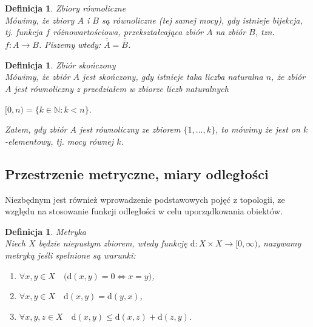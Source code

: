 \documentclass[12pt,a4paper]{report}
\newtheorem{definition}[theorem]{Definicja}
\newcommand{\licznosc}[1]{\overline{\overline{#1}}}
\begin{document}
\begin{definition}{Zbiory równoliczne \cite[Rozdział 5]{blaszczyk2007}\\}
Mówimy, że zbiory $A$ i $B$ są równoliczne (tej samej mocy), gdy istnieje bijekcja, tj. funkcja $f$ różnowartościowa, przekształcająca zbiór $A$ na zbiór $B$, tzn. $f: A \rightarrow B$. Piszemy wtedy:  $\licznosc{A}=\licznosc{B}$.
\end{definition}

\begin{definition}{Zbiór skończony \cite[Rozdział 5]{blaszczyk2007}\\}
Mówimy, że zbiór $A$ jest skończony, gdy istnieje taka liczba naturalna $n$, że zbiór $A$ jest równoliczny z przedziałem w zbiorze liczb naturalnych
\begin{center}
$[0, n) = \{ k \in \mathbb{N}: k < n\}.$
\end{center}
Zatem, gdy zbiór $A$ jest równoliczny ze zbiorem $\{1, ..., k\}$, to mówimy że jest on $k$-elementowy, tj. mocy równej $k$.
\end{definition}









\subsection{Przestrzenie metryczne, miary odległości}
\noindent

Niezbędnym jest również wprowadzenie podstawowych pojęć z topologii, ze względu na stosowanie funkcji odległości w celu uporządkowania obiektów.\\

\begin{definition}{Metryka \cite[Rozdzial 9]{kuratowski2004}\\}
Niech $X$ będzie niepustym zbiorem, wtedy funkcję $\mathrm{d}: X \times X \rightarrow [0,\infty)$, nazywamy metryką jeśli spełnione są warunki:
\begin{enumerate}
\item $\forall x, y \in X \quad \big(\mathrm{d}(x,y) = 0  \Longleftrightarrow x=y \big)$,
\item $\forall x, y \in X \quad \mathrm{d}(x,y)=\mathrm{d}(y,x)$,
\item $\forall  x, y, z \in X \quad \mathrm{d}(x,y)\leq \mathrm{d}(x,z)+\mathrm{d}(z,y)$.\\
\end{enumerate}
\end{definition}
\end{document}

